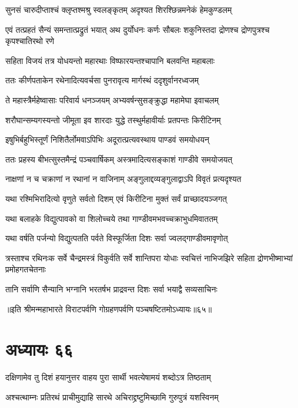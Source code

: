 \twolineshloka
{सुनसं चारुदीप्ताश्चं क्लृप्तश्मश्रु स्वलङ्कृतम्}
{अदृश्यत शिरश्छिन्नमनेकं हेमकुण्डलम्}


\onelineshloka
{एवं तत्प्रहतं सैन्यं समन्तात्प्रद्रुतं भयात्}
\twolineshloka
{अथ दुर्योधनः कर्णः सौबलः शकुनिस्तदा}
{द्रोणश्च द्रोणपुत्रश्च कृपश्चातिरथो रणे}


\twolineshloka
{सहिता विजयं तत्र योधयन्तो महारथाः}
{विष्फारयन्तश्चापानि बलवन्ति महाबलाः}


\twolineshloka
{ततः कीर्णपताकेन रथेनादित्यवर्चसा}
{पुनरावृत्य मार्गस्थं ददृशुर्वानरध्वजम्}


\twolineshloka
{ते महास्त्रैर्महेष्वासाः परिवार्य धनञ्जयम्}
{अभ्यवर्षन्सुसङ्क्रुद्धा महामेघा इवाचलम्}


\twolineshloka
{शरौघान्सम्यगस्यन्तो जीमूता इव शारदाः}
{युद्धे तस्थुर्महावीर्याः प्रतपन्तः किरीटिनम्}


\twolineshloka
{इषुभिर्बहुभिस्तूर्णं निशितैर्लोमवाऽपिभिः}
{अदूरात्प्रत्यवस्थाय पाण्डवं समयोधयन्}


\twolineshloka
{ततः प्रहस्य बीभत्सुस्तमैन्द्रं पञ्चवार्षिकम्}
{अस्त्रमादित्यसङ्काशं गाण्डीवे समयोजयत्}


\twolineshloka
{नाक्षणां न च चक्राणां न रथानां न वाजिनाम्}
{अङ्गुलाद्दव्यङ्गुलाद्वाऽपि विवृतं प्रत्यदृश्यत}


\twolineshloka
{यथा रश्मिभिरादित्यो वृणुते सर्वतो दिशम्}
{एवं किरीटिना मुक्तं सर्वं प्राच्छादयञ्जगत्}


\twolineshloka
{यथा बलाहके विद्युत्पावको वा शिलोच्चये}
{तथा गाण्डीवमभवच्चक्राभुधमिवाततम्}


\twolineshloka
{यथा वर्षति पर्जन्यो विद्युत्पतति पर्वते}
{विस्फूर्जिता दिशः सर्वा ज्वलद्गाण्डीवमावृणोत्}


\threelineshloka
{त्रस्ताश्च रथिनःक सर्वे चैन्द्रमस्त्रं विकुर्वति}
{सर्वे शान्तिपरा योधाः स्वचित्तं नाभिजझिरे}
{सहिता द्रोणभीष्माभ्यां प्रमोहगतचेतनाः}


\twolineshloka
{तानि सर्वाणि सैन्यानि भग्नानि भरतर्षभ}
{प्राद्रवन्त दिशः सर्वा भयाद्वै सव्यसाचिनः}

॥इति श्रीमन्महाभारते विराटपर्वणि गोग्रहणपर्वणि पञ्चषष्टितमोऽध्यायः॥६५॥

\chapter{अध्यायः ६६}

\twolineshloka
{दक्षिणामेव तु दिशं हयानुत्तर वाहय}
{पुरा सार्थी भवत्येषामयं शब्दोऽत्र तिष्ठताम्}


\twolineshloka
{अश्चत्थाम्नः प्रतिरथं प्राचीमुद्याहि सारथे}
{अचिराद्द्रष्टुमिच्छामि गुरुपुत्रं यशस्विनम्}


